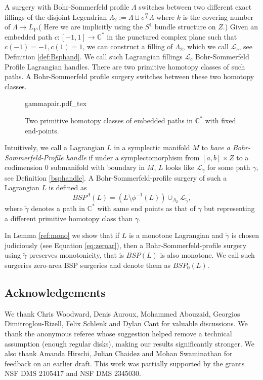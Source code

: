 \documentclass[11pt, oneside,dvipsnames]{amsart}
\newcommand{\incfig}[2]{
   
        \def\svgscale{#1}
    {#2.pdf_tex}
      
      
  
 }
\renewcommand{\to}{\rightarrow}
\newcommand{\inv}{^{-1}}
\newcommand{\wt}{\widetilde}
\renewcommand{\to}{\rightarrow}
\newcommand{\<}{\langle}
\renewcommand{\>}{\rangle}
\newcommand{\bC}{\mathbb{C}}
\newcommand{\cL}{\mathcal{L}}
\newcommand{\sm}{\ensuremath{\setminus}}
\renewcommand{\to}{\rightarrow}
\theoremstyle{definition}
\theoremstyle{definition}
\numberwithin{equation}{subsection}
\begin{document}
A surgery with Bohr-Sommerfeld profile $\Lambda$ switches between two different exact fillings of the disjoint Legendrian $\Lambda_2 := \Lambda \sqcup e^{\frac{i\pi}{k}}\Lambda$ where $k$ is the covering number of $\Lambda \to L_Y$.(  Here we are implicitly using the $S^1$ bundle structure on $Z$.)
Given an embedded path $c:[-1,1] \to \bC^*$ in the punctured complex plane such that $c(-1) = -1, c(1) = 1$, we can construct a filling of $\Lambda_2$, which we call $\cL_c$, see Definition \ref{def:Bsphand}.  We call such Lagrangian fillings $\cL_c$  Bohr-Sommerfeld Profile Lagrangian handles. There are two primitive homotopy classes of such paths. A Bohr-Sommerfeld profile surgery switches between these two homotopy classes. 

\begin{figure}[ht]
    \incfig{0.6}{gammapair}
    \caption{Two primitive homotopy classes of embedded paths in $\bC^*$ with fixed end-points.  }
    \label{fig:gammapair}
\end{figure}

Intuitively, we call a Lagrangian $L$ in a symplectic manifold $M$ to \textit{have a Bohr-Sommerfeld-Profile handle} if under a symplectomorphism from $[a,b]\times Z$ to a codimension 0 submanifold with boundary in  $M$,    $L$ looks like $\cL_\gamma$ for some path $\gamma,$ see Definition \ref{bsphandle}. A Bohr-Sommerfeld-profile surgery of such a Lagrangian $L$ is defined as     \begin{equation*}
        BSP^{\Lambda}(L) = (L \sm \phi\inv ( L) )\cup _{  \Lambda_2 } \cL_{\wt \gamma}, 
    \end{equation*}  where $\wt\gamma$ denotes a path in $\bC^*$ with same end points as that of $\gamma$ but representing a different primitive homotopy class than $\gamma$.



In Lemma \ref{ref:mono} we show that if $L$ is a monotone Lagrangian and $\wt\gamma$ is chosen judiciously (see Equation \ref{eq:zeroar}), then a Bohr-Sommerfeld-profile surgery using $\wt \gamma$ preserves monotonicity, that is $BSP(L)$ is also monotone. We call such surgeries zero-area BSP surgeries and denote them  as $BSP_0(L)$.



\subsection{Acknowledgements}
We thank Chris Woodward, Denis Auroux, Mohammed Abouzaid, Georgios Dimitroglou-Rizell, Felix Schlenk and Dylan Cant for valuable discussions. We thank the anonymous referee whose suggestion helped remove a technical assumption (enough regular disks), making our results significantly stronger.  We also thank Amanda Hirschi, Julian Chaidez and Mohan Swaminathan for feedback on an earlier draft.  This work was partially supported by the grants NSF DMS 2105417 and NSF DMS 2345030. 
\end{document}

